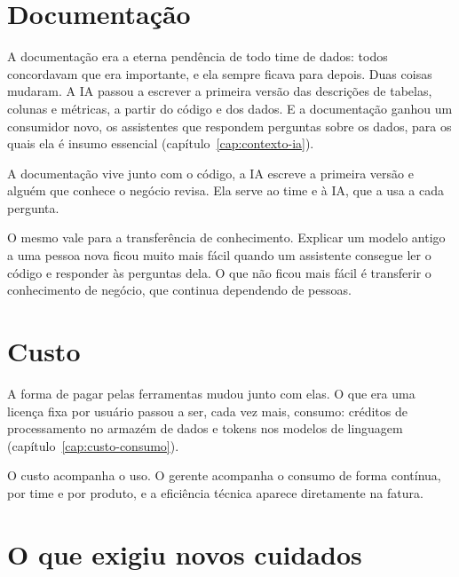 \section{Documentação}
\label{sec:ad-documentacao}

A documentação era a eterna pendência de todo time de dados: todos concordavam que era
importante, e ela sempre ficava para depois. Duas coisas mudaram. A IA passou a escrever a
primeira versão das descrições de tabelas, colunas e métricas, a partir do código e dos dados. E a
documentação ganhou um consumidor novo, os assistentes que respondem perguntas sobre os dados, para
os quais ela é insumo essencial (capítulo~\ref{cap:contexto-ia}).

{A documentação vive junto com o código, a IA escreve a primeira versão e alguém que conhece o
negócio revisa. Ela serve ao time e à IA, que a usa a cada pergunta.}

O mesmo vale para a transferência de conhecimento. Explicar um modelo antigo a uma pessoa nova
ficou muito mais fácil quando um assistente consegue ler o código e responder às perguntas dela.
O que não ficou mais fácil é transferir o conhecimento de negócio, que continua dependendo de
pessoas.

\section{Custo}
\label{sec:ad-custo}

A forma de pagar pelas ferramentas mudou junto com elas. O que era uma licença fixa por usuário
passou a ser, cada vez mais, consumo: créditos de processamento no armazém de dados e tokens nos
modelos de linguagem (capítulo~\ref{cap:custo-consumo}).

{O custo acompanha o uso. O gerente acompanha o consumo de forma contínua, por time e por
produto, e a eficiência técnica aparece diretamente na fatura.}


\section{O que exigiu novos cuidados}
\label{sec:ad-cuidados}

